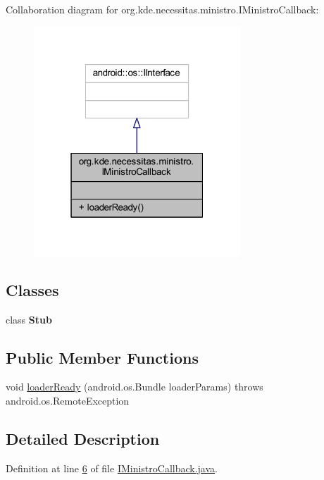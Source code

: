 Collaboration diagram for org.\-kde.\-necessitas.\-ministro.\-I\-Ministro\-Callback\-:\nopagebreak
\begin{figure}[H]
\begin{center}
\leavevmode
\includegraphics[width=220pt]{d6/df4/interfaceorg_1_1kde_1_1necessitas_1_1ministro_1_1_i_ministro_callback__coll__graph}
\end{center}
\end{figure}
\subsection*{Classes}
\begin{DoxyCompactItemize}
\item 
class {\bfseries Stub}
\end{DoxyCompactItemize}
\subsection*{Public Member Functions}
\begin{DoxyCompactItemize}
\item 
void \hyperlink{interfaceorg_1_1kde_1_1necessitas_1_1ministro_1_1_i_ministro_callback_ac67b08ed6184a57c5c732f2f8911a3bf}{loader\-Ready} (android.\-os.\-Bundle loader\-Params)  throws android.\-os.\-Remote\-Exception
\end{DoxyCompactItemize}


\subsection{Detailed Description}


Definition at line \hyperlink{_i_ministro_callback_8java_source_l00006}{6} of file \hyperlink{_i_ministro_callback_8java_source}{I\-Ministro\-Callback.\-java}.



